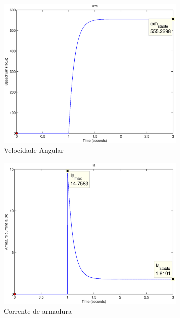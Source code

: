\documentclass{article}
\begin{document}
\begin{figure}[H]
	\centering
	\begin{subfigure}[b]{0.49\linewidth}
		\includegraphics[width=\linewidth]{matlab/wm3}
		\caption{Velocidade Angular}
	\end{subfigure}
	\begin{subfigure}[b]{0.49\linewidth}
		\centering
		\includegraphics[width=\linewidth]{matlab/ia3}
		\caption{Corrente de armadura}
	\end{subfigure}
	\begin{subfigure}[b]{0.49\linewidth}

\end{subfigure}
\end{figure}
\end{document}

